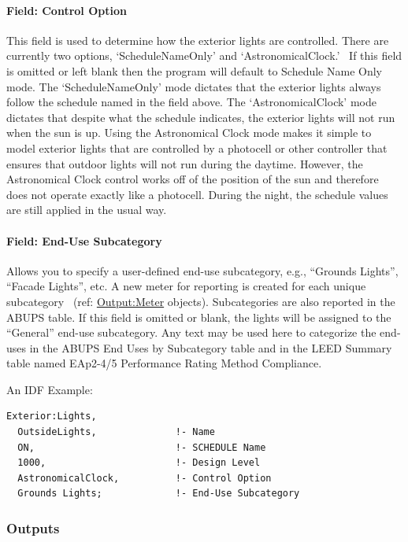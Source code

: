 \paragraph{Field: Control Option}\label{field-control-option}

This field is used to determine how the exterior lights are controlled. There are currently two options, `ScheduleNameOnly' and `AstronomicalClock.'~ If this field is omitted or left blank then the program will default to Schedule Name Only mode. The `ScheduleNameOnly' mode dictates that the exterior lights always follow the schedule named in the field above. The `AstronomicalClock' mode dictates that despite what the schedule indicates, the exterior lights will not run when the sun is up. Using the Astronomical Clock mode makes it simple to model exterior lights that are controlled by a photocell or other controller that ensures that outdoor lights will not run during the daytime. However, the Astronomical Clock control works off of the position of the sun and therefore does not operate exactly like a photocell. During the night, the schedule values are still applied in the usual way.

\paragraph{Field: End-Use Subcategory}\label{field-end-use-subcategory-000}

Allows you to specify a user-defined end-use subcategory, e.g., ``Grounds Lights'', ``Facade Lights'', etc. A new meter for reporting is created for each unique subcategory~ (ref: \hyperref[outputmeter-and-outputmetermeterfileonly]{Output:Meter} objects). Subcategories are also reported in the ABUPS table. If this field is omitted or blank, the lights will be assigned to the ``General'' end-use subcategory. Any text may be used here to categorize the end-uses in the ABUPS End Uses by Subcategory table and in the LEED Summary table named EAp2-4/5 Performance Rating Method Compliance.

An IDF Example:

\begin{lstlisting}
Exterior:Lights,
  OutsideLights,              !- Name
  ON,                         !- SCHEDULE Name
  1000,                       !- Design Level
  AstronomicalClock,          !- Control Option
  Grounds Lights;             !- End-Use Subcategory
\end{lstlisting}

\subsubsection{Outputs}\label{outputs-012}

